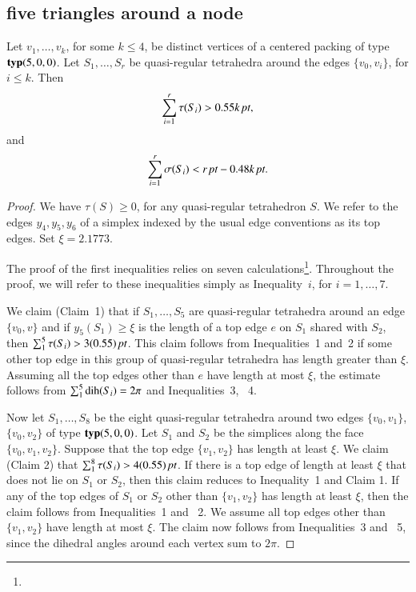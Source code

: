 \subsection{five triangles around a node}

\begin{lemma}
    \label{lemma:0.55}
Let $v_1,\ldots, v_k$, for some $k\le 4$, be distinct vertices of
a centered packing of type ${\operatorname{\bf typ}}{(5,0,0)}$.  Let $S_1,\ldots, S_r$ be
quasi-regular tetrahedra around the edges $\{v_0,v_i\}$, for $i\le
k$. Then
    $$\sum_{i=1}^r \tau(S_i)> 0.55k\,\hbox{\it pt},$$
and
    $$\sum_{i=1}^r \sigma(S_i) < r\,\hbox{\it pt} - 0.48k\,\hbox{\it pt}.$$
\end{lemma}


\begin{proof}
We have $\tau(S)\ge 0$, for any quasi-regular tetrahedron $S$.  We
refer to the edges $y_4,y_5,y_6$ of a simplex indexed by the
usual edge conventions 
as its top edges. Set $\xi=2.1773$.

The proof of the first inequalities relies on seven
calculations\footnote{}. Throughout the proof, we
will refer to these inequalities simply as Inequality~$i$, for
$i=1,\ldots,7$.

We claim (Claim~1) that if $S_1,\ldots,S_5$ are quasi-regular
tetrahedra around an edge $\{v_0,v\}$ and if 
$y_5(S_1)\ge\xi$ is the length of a top edge $e$ on $S_1$ shared
with $S_2$, then $\sum_1^5\tau(S_i) > 3(0.55)\,\hbox{\it pt}$.  This claim
follows from Inequalities~1 and~2 if some other top edge in this
group of quasi-regular tetrahedra has length greater than $\xi$.
Assuming all the top edges other than $e$ have length at most
$\xi$, the estimate follows from $\sum_1^5\operatorname{dih}(S_i)=2\pi$ and
Inequalities~3, ~4.

Now let $S_1,\ldots,S_8$ be the eight quasi-regular tetrahedra
around two edges $\{v_0,v_1\}$, $\{v_0,v_2\}$ of type ${\operatorname{\bf typ}}{(5,0,0)}$. Let $S_1$
and $S_2$ be the simplices along the face $\{v_0,v_1,v_2\}$. Suppose
that the top edge $\{v_1,v_2\}$ has length at least $\xi$. We claim
(Claim 2) that $\sum_1^8\tau(S_i)> 4(0.55)\,\hbox{\it pt}$.  If there is a
top edge of length at least $\xi$ that does not lie on $S_1$ or
$S_2$, then this claim reduces to Inequality~1 and Claim 1. If any
of the top edges of $S_1$ or $S_2$ other than $\{v_1,v_2\}$ has
length at least $\xi$, then the claim follows from Inequalities~1
and ~2. We assume all top edges other than $\{v_1,v_2\}$ have length
at most $\xi$. The claim now follows from Inequalities~3 and ~5,
since the dihedral angles around each vertex sum to $2\pi$.


\end{proof}
